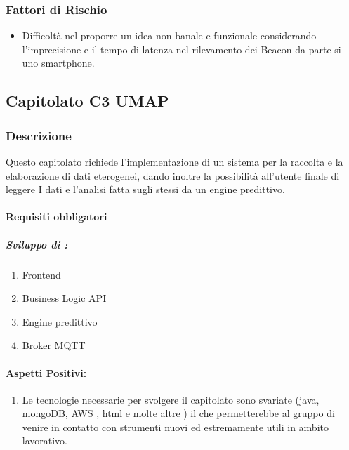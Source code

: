 \documentclass[12pt,a4paper]{article}
\begin{document}
\subsubsection{Fattori di Rischio}

\begin{itemize}
\item Difficoltà nel proporre un idea non banale e funzionale considerando l'imprecisione e il tempo di latenza nel rilevamento dei Beacon da parte si uno smartphone.
\end{itemize}

\newpage
\subsection{Capitolato C3 UMAP}
\subsubsection{Descrizione}

Questo capitolato richiede l'implementazione di un sistema per la  raccolta e la elaborazione di dati eterogenei, dando inoltre la possibilità all'utente finale di leggere I dati e l'analisi fatta sugli stessi da un engine predittivo.
\paragraph{Requisiti obbligatori}  
\subparagraph{Sviluppo di :}	
	\begin{enumerate}
	\item Frontend
	\item Business Logic API 
	\item Engine predittivo
	\item Broker MQTT 
	\end{enumerate}

\paragraph{Aspetti Positivi:}
\begin{enumerate}
\item	Le tecnologie necessarie per svolgere il capitolato sono svariate (java, mongoDB, AWS , html e molte altre ) il che permetterebbe al gruppo di venire in contatto con strumenti nuovi ed estremamente utili in ambito lavorativo.
\end{enumerate}
\end{document}
